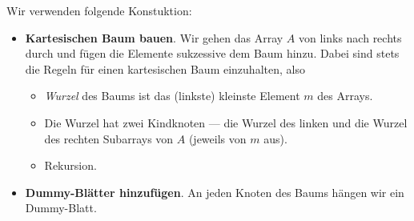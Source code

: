Wir verwenden folgende Konstuktion:

\begin{itemize}
  \item \textbf{Kartesischen Baum bauen}. \quad Wir gehen das Array \( A \) von links nach rechts durch und fügen die Elemente sukzessive dem Baum hinzu. Dabei sind stets die Regeln für einen kartesischen Baum einzuhalten, also
  \begin{itemize}
    \item \emph{Wurzel} des Baums ist das (linkste) kleinste Element \( m \) des Arrays.
    \item Die Wurzel hat zwei Kindknoten --- die Wurzel des linken und die Wurzel des rechten Subarrays von \( A \) (jeweils von \( m \) aus).
    \item Rekursion.
  \end{itemize}
  \item \textbf{Dummy-Blätter hinzufügen}. \quad An jeden Knoten des Baums hängen wir ein Dummy-Blatt.
\end{itemize}